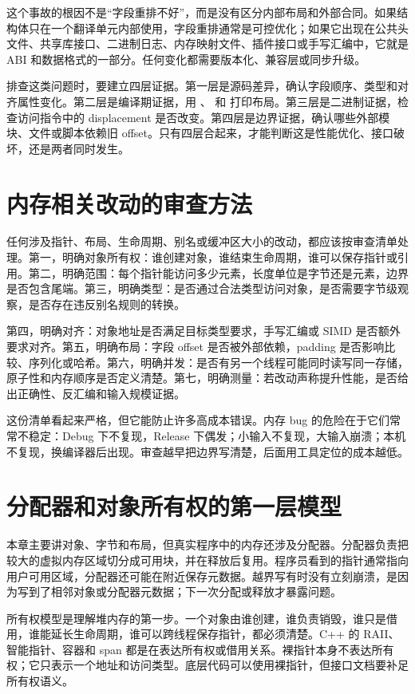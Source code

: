 这个事故的根因不是“字段重排不好”，而是没有区分内部布局和外部合同。如果结构体只在一个翻译单元内部使用，字段重排通常是可控优化；如果它出现在公共头文件、共享库接口、二进制日志、内存映射文件、插件接口或手写汇编中，它就是 ABI 和数据格式的一部分。任何变化都需要版本化、兼容层或同步升级。

排查这类问题时，要建立四层证据。第一层是源码差异，确认字段顺序、类型和对齐属性变化。第二层是编译期证据，用 、 和  打印布局。第三层是二进制证据，检查访问指令中的 displacement 是否改变。第四层是边界证据，确认哪些外部模块、文件或脚本依赖旧 offset。只有四层合起来，才能判断这是性能优化、接口破坏，还是两者同时发生。

\section{内存相关改动的审查方法}

任何涉及指针、布局、生命周期、别名或缓冲区大小的改动，都应该按审查清单处理。第一，明确对象所有权：谁创建对象，谁结束生命周期，谁可以保存指针或引用。第二，明确范围：每个指针能访问多少元素，长度单位是字节还是元素，边界是否包含尾端。第三，明确类型：是否通过合法类型访问对象，是否需要字节级观察，是否存在违反别名规则的转换。

第四，明确对齐：对象地址是否满足目标类型要求，手写汇编或 SIMD 是否额外要求对齐。第五，明确布局：字段 offset 是否被外部依赖，padding 是否影响比较、序列化或哈希。第六，明确并发：是否有另一个线程可能同时读写同一存储，原子性和内存顺序是否定义清楚。第七，明确测量：若改动声称提升性能，是否给出正确性、反汇编和输入规模证据。

这份清单看起来严格，但它能防止许多高成本错误。内存 bug 的危险在于它们常常不稳定：Debug 下不复现，Release 下偶发；小输入不复现，大输入崩溃；本机不复现，换编译器后出现。审查越早把边界写清楚，后面用工具定位的成本越低。

\section{分配器和对象所有权的第一层模型}

本章主要讲对象、字节和布局，但真实程序中的内存还涉及分配器。分配器负责把较大的虚拟内存区域切分成可用块，并在释放后复用。程序员看到的指针通常指向用户可用区域，分配器还可能在附近保存元数据。越界写有时没有立刻崩溃，是因为写到了相邻对象或分配器元数据；下一次分配或释放才暴露问题。

所有权模型是理解堆内存的第一步。一个对象由谁创建，谁负责销毁，谁只是借用，谁能延长生命周期，谁可以跨线程保存指针，都必须清楚。C++ 的 RAII、智能指针、容器和 span 都是在表达所有权或借用关系。裸指针本身不表达所有权；它只表示一个地址和访问类型。底层代码可以使用裸指针，但接口文档要补足所有权语义。

